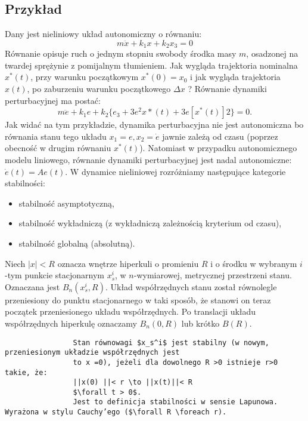 \documentclass{article}
\begin{document}
		\subsection{Przykład}
			Dany jest nieliniowy układ autonomiczny o równaniu:
			\begin{equation}
				m\ddot{x} + k_1x + k_2 x_3 = 0
			\end{equation}
			Równanie opisuje ruch o jednym stopniu swobody środka masy $m$, osadzonej na twardej
			sprężynie z pomijalnym tłumieniem.
			Jak wygląda trajektoria nominalna $x^*(t)$, przy warunku początkowym $x^*(0) = x_0$ i jak
			wygląda trajektoria $x(t)$, po zaburzeniu warunku początkowego $\Delta x$ ?
			Równanie dynamiki perturbacyjnej ma postać:
			\begin{equation}
				m\ddot{e} + k_1e + k_2\{e_3 + 3e^2x*(t) + 3e [x^*(t)]2 \}= 0.
			\end{equation}
			Jak widać na tym przykładzie, dynamika perturbacyjna nie jest autonomiczna bo
			równania stanu tego układu $x_1 = e, x_2 = \dot{e} $ jawnie zależą od czasu (poprzez obecność
			w drugim równaniu $x^*(t)$).
			Natomiast w przypadku autonomicznego modelu liniowego, równanie dynamiki
			perturbacyjnej jest nadal autonomiczne: $\dot{e}(t) = A e(t)$.
			W dynamice nieliniowej rozróżniamy następujące kategorie stabilności:
			\begin{itemize}
				\item stabilność asymptotyczną,
				\item stabilność wykładniczą (z wykładniczą zależnością kryterium od czasu),
				\item stabilność globalną (absolutną).
			\end{itemize}
			Niech $ | x | < R$ oznacza wnętrze hiperkuli o promieniu $R$ i o środku w wybranym $i$-tym
			punkcie stacjonarnym $x_s^i$, w $n$-wymiarowej, metrycznej przestrzeni stanu.
			Oznaczana jest $B_n(x_s^i, R)$. Układ współrzędnych stanu został równolegle przeniesiony do
			punktu stacjonarnego w taki sposób, że stanowi on teraz początek przeniesionego
			układu współrzędnych. Po translacji układu współrzędnych hiperkulę oznaczamy
			$B_n(0,R)$ lub krótko $B(R)$.
			\begin{verbatim}
				Stan równowagi $x_s^i$ jest stabilny (w nowym, przeniesionym układzie współrzędnych jest
				to x =0), jeżeli dla dowolnego R >0 istnieje r>0 takie, że:
				||x(0) ||< r \to ||x(t)||< R
				$\forall t > 0$.
				Jest to definicja stabilności w sensie Lapunowa. Wyrażona w stylu Cauchy’ego ($\forall R \foreach r).
			\end{verbatim}
\end{document}
